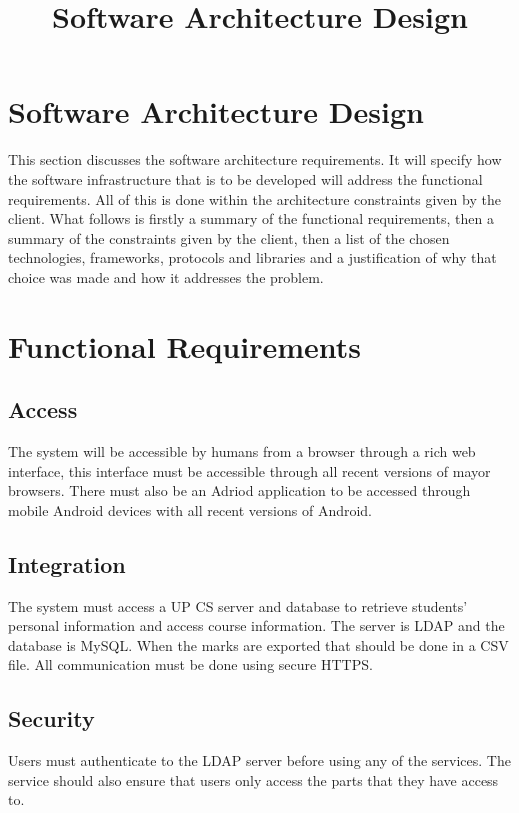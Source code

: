 \documentclass[a4paper]{article}
\title{Software Architecture Design}
\author{}
\date{}
\begin{document}
\maketitle

\section{Software Architecture Design}

This section discusses the software architecture requirements. It will specify how the software infrastructure that is to be developed will address the functional requirements. All of this is done within the architecture constraints given by the client. What follows is firstly a summary of the functional requirements, then a summary of the constraints given by the client, then a list of the chosen technologies, frameworks, protocols and libraries and a justification of why that choice was made and how it addresses the problem. 

\section{Functional Requirements}

\subsection{Access}

The system will be accessible by humans from a browser through a rich web interface, this interface must be accessible through all recent versions of mayor browsers. There must also be an Adriod application to be accessed through mobile Android devices with all recent versions of Android.
	
\subsection{Integration}

The system must access a UP CS server and database to retrieve students' personal information and access course information. The server is LDAP and the database is MySQL. When the marks are exported that should be done in a CSV file. All communication must be done using secure HTTPS.

\subsection{Security}

Users must authenticate to the LDAP server before using any of the services. The service should also ensure that users only access the parts that they have access to. 
	
\end{document}

